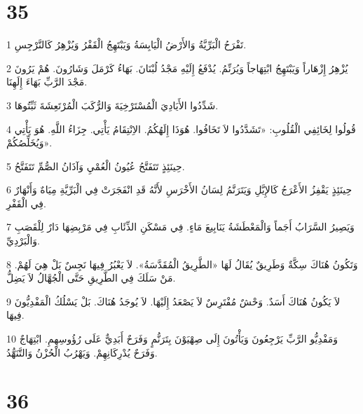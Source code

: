 \chapter{35}

\par 1 تَفْرَحُ الْبَرِّيَّةُ وَالأَرْضُ الْيَابِسَةُ وَيَبْتَهِجُ الْقَفْرُ وَيُزْهِرُ كَالنَّرْجِسِ.
\par 2 يُزْهِرُ إِزْهَاراً وَيَبْتَهِجُ ابْتِهَاجاً وَيُرَنِّمُ. يُدْفَعُ إِلَيْهِ مَجْدُ لُبْنَانَ. بَهَاءُ كَرْمَلَ وَشَارُونَ. هُمْ يَرُونَ مَجْدَ الرَّبِّ بَهَاءَ إِلَهِنَا.
\par 3 شَدِّدُوا الأَيَادِيَ الْمُسْتَرْخِيَةَ وَالرُّكَبَ الْمُرْتَعِشَةَ ثَبِّتُوهَا.
\par 4 قُولُوا لِخَائِفِي الْقُلُوبِ: «تَشَدَّدُوا لاَ تَخَافُوا. هُوَذَا إِلَهُكُمُ. الاِنْتِقَامُ يَأْتِي. جِزَاءُ اللَّهِ. هُوَ يَأْتِي وَيُخَلِّصُكُمْ».
\par 5 حِينَئِذٍ تَتَفَتَّحُ عُيُونُ الْعُمْيِ وَآذَانُ الصُّمِّ تَتَفَتَّحُ.
\par 6 حِينَئِذٍ يَقْفِزُ الأَعْرَجُ كَالإِيَّلِ وَيَتَرَنَّمُ لِسَانُ الأَخْرَسِ لأَنَّهُ قَدِ انْفَجَرَتْ فِي الْبَرِّيَّةِ مِيَاهٌ وَأَنْهَارٌ فِي الْقَفْرِ.
\par 7 وَيَصِيرُ السَّرَابُ أَجَماً وَالْمَعْطَشَةُ يَنَابِيعَ مَاءٍ. فِي مَسْكَنِ الذِّئَابِ فِي مَرْبِضِهَا دَارٌ لِلْقَصَبِ وَالْبَرْدِيِّ.
\par 8 وَتَكُونُ هُنَاكَ سِكَّةٌ وَطَرِيقٌ يُقَالُ لَهَا «الطَّرِيقُ الْمُقَدَّسَةُ». لاَ يَعْبُرُ فِيهَا نَجِسٌ بَلْ هِيَ لَهُمْ. مَنْ سَلَكَ فِي الطَّرِيقِ حَتَّى الْجُهَّالُ لاَ يَضِلُّ.
\par 9 لاَ يَكُونُ هُنَاكَ أَسَدٌ. وَحْشٌ مُفْتَرِسٌ لاَ يَصْعَدُ إِلَيْهَا. لاَ يُوجَدُ هُنَاكَ. بَلْ يَسْلُكُ الْمَفْدِيُّونَ فِيهَا.
\par 10 وَمَفْدِيُّو الرَّبِّ يَرْجِعُونَ وَيَأْتُونَ إِلَى صِهْيَوْنَ بِتَرَنُّمٍ وَفَرَحٌ أَبَدِيٌّ عَلَى رُؤُوسِهِمِ. ابْتِهَاجٌ وَفَرَحٌ يُدْرِكَانِهِمْ. وَيَهْرُبُ الْحُزْنُ وَالتَّنَهُّدُ.

\chapter{36}

